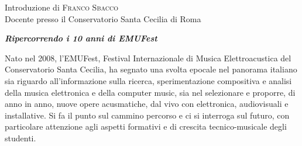 \begin{flushleft}
\bigskip

Introduzione di \textsc{Franco Sbacco}\\
{\footnotesize Docente presso il Conservatorio Santa Cecilia di Roma}


\bigskip

\textbf{\emph{Ripercorrendo i 10 anni di EMUFest}}

\medskip

Nato nel 2008, l’EMUFest, Festival Internazionale di Musica Elettroacustica del Conservatorio Santa Cecilia, ha segnato una svolta epocale nel panorama italiano sia riguardo all’informazione sulla ricerca, sperimentazione compositiva e analisi della musica elettronica e della computer music, sia nel selezionare e proporre, di anno in anno, nuove opere acusmatiche, dal vivo con elettronica, audiovisuali e installative. Si fa il punto sul cammino percorso e ci si interroga sul futuro, con particolare attenzione agli aspetti formativi e di crescita tecnico-musicale degli studenti.

\end{flushleft}

\vfill

